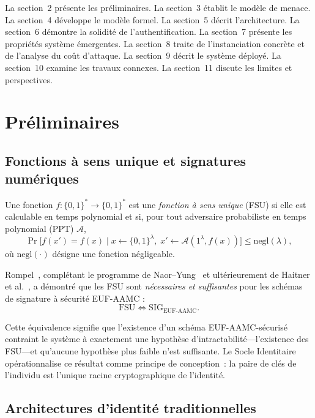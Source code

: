 \documentclass[11pt,a4paper]{article}
\begin{document}
La section~2 présente les préliminaires.  La section~3 établit le modèle de
menace.  La section~4 développe le modèle formel.  La section~5 décrit
l'architecture.  La section~6 démontre la solidité de l'authentification.
La section~7 présente les propriétés système émergentes.  La section~8
traite de l'instanciation concrète et de l'analyse du coût d'attaque.  La
section~9 décrit le système déployé.  La section~10 examine les travaux
connexes.  La section~11 discute les limites et perspectives.

\section{Préliminaires}

\subsection{Fonctions à sens unique et signatures numériques}

Une fonction $f : \{0,1\}^* \to \{0,1\}^*$ est une
\emph{fonction à sens unique} (FSU) si elle est calculable en temps
polynomial et si, pour tout adversaire probabiliste en temps polynomial (PPT)
$\mathcal{A}$,
\[
  \Pr\bigl[f(x') = f(x) \;\big|\; x \gets \{0,1\}^\lambda,\;
    x' \gets \mathcal{A}(1^\lambda, f(x))\bigr] \leq \mathrm{negl}(\lambda),
\]
où $\mathrm{negl}(\cdot)$ désigne une fonction négligeable.

Rompel~\cite{rompel1990}, complétant le programme de
Naor--Yung~\cite{naoryung1989} et ultérieurement de Haitner et
al.~\cite{haitner2010}, a démontré que les FSU sont \emph{nécessaires et
suffisantes} pour les schémas de signature à sécurité EUF-AAMC :
\[
  \mathrm{FSU} \iff \mathrm{SIG}_{\mathrm{EUF\text{-}AAMC}}.
\]

Cette équivalence signifie que l'existence d'un schéma EUF-AAMC-sécurisé
contraint le système à exactement une hypothèse d'intractabilité---l'existence
des FSU---et qu'aucune hypothèse plus faible n'est suffisante.  Le Socle
Identitaire opérationnalise ce résultat comme principe de conception~: la
paire de clés de l'individu est l'unique racine cryptographique de l'identité.

\subsection{Architectures d'identité traditionnelles}
\end{document}
